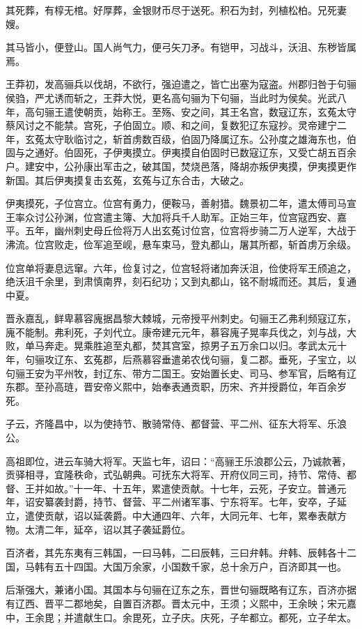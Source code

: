 \documentclass[12pt,UTF8]{ctexbook}
\begin{document}
其死葬，有椁无棺。好厚葬，金银财币尽于送死。积石为封，列植松柏。兄死妻嫂。

其马皆小，便登山。国人尚气力，便弓矢刀矛。有铠甲，习战斗，沃沮、东秽皆属焉。

王莽初，发高骊兵以伐胡，不欲行，强迫遣之，皆亡出塞为寇盗。州郡归咎于句骊侯驺，严尤诱而斩之，王莽大悦，更名高句骊为下句骊，当此时为侯矣。光武八年，高句骊王遣使朝贡，始称王。至殇、安之间，其王名宫，数寇辽东，玄菟太守蔡风讨之不能禁。宫死，子伯固立。顺、和之间，复数犯辽东寇抄。灵帝建宁二年，玄菟太守耿临讨之，斩首虏数百级，伯固乃降属辽东。公孙度之雄海东也，伯固与之通好。伯固死，子伊夷摸立。伊夷摸自伯固时已数寇辽东，又受亡胡五百余户。建安中，公孙康出军击之，破其国，焚烧邑落，降胡亦叛伊夷摸，伊夷摸更作新国。其后伊夷摸复击玄菟，玄菟与辽东合击，大破之。

伊夷摸死，子位宫立。位宫有勇力，便鞍马，善射猎。魏景初二年，遣太傅司马宣王率众讨公孙渊，位宫遣主簿、大加将兵千人助军。正始三年，位宫寇西安、嘉平。五年，幽州刺史母丘俭将万人出玄菟讨位宫，位宫将步骑二万人逆军，大战于沸流。位宫败走，俭军追至岘，悬车束马，登丸都山，屠其所都，斩首虏万余级。

位宫单将妻息远窜。六年，俭复讨之，位宫轻将诸加奔沃沮，俭使将军王颀追之，绝沃沮千余里，到肃慎南界，刻石纪功；又到丸都山，铭不耐城而还。其后，复通中夏。

晋永嘉乱，鲜卑慕容廆据昌黎大棘城，元帝授平州刺史。句骊王乙弗利频寇辽东，廆不能制。弗利死，子刘代立。康帝建元元年，慕容廆子晃率兵伐之，刘与战，大败，单马奔走。晃乘胜追至丸都，焚其宫室，掠男子五万余口以归。孝武太元十年，句骊攻辽东、玄菟郡，后燕慕容垂遣弟农伐句骊，复二郡。垂死，子宝立，以句骊王安为平州牧，封辽东、带方二国王。安始置长史、司马、参军官，后略有辽东郡。至孙高琏，晋安帝义熙中，始奉表通贡职，历宋、齐并授爵位，年百余岁死。

子云，齐隆昌中，以为使持节、散骑常侍、都督营、平二州、征东大将军、乐浪公。

高祖即位，进云车骑大将军。天监七年，诏曰：“高骊王乐浪郡公云，乃诚款著，贡驿相寻，宜隆秩命，式弘朝典。可抚东大将军、开府仪同三司，持节、常侍、都督、王并如故。”十一年、十五年，累遣使贡献。十七年，云死，子安立。普通元年，诏安纂袭封爵，持节、督营、平二州诸军事、宁东将军。七年，安卒，子延立，遣使贡献，诏以延袭爵。中大通四年、六年，大同元年、七年，累奉表献方物。太清二年，延卒，诏以其子袭延爵位。

百济者，其先东夷有三韩国，一曰马韩，二曰辰韩，三曰弁韩。弁韩、辰韩各十二国，马韩有五十四国。大国万余家，小国数千家，总十余万户，百济即其一也。

后渐强大，兼诸小国。其国本与句骊在辽东之东，晋世句骊既略有辽东，百济亦据有辽西、晋平二郡地矣，自置百济郡。晋太元中，王须；义熙中，王余映；宋元嘉中，王余毘；并遣献生口。余毘死，立子庆。庆死，子牟都立。都死，立子牟太。
\end{document}
